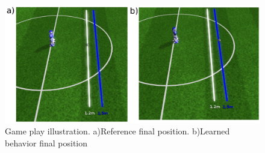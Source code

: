 \begin{figure}[H]
    \centering
    \includegraphics[width=1.0\textwidth]{Chapter7/figures/kick_train_15.pdf} 
    \caption{Game play illustration. a)Reference final position. b)Learned behavior final position}
    \label{fig:RL_15_kick_roboviz}
\end{figure}